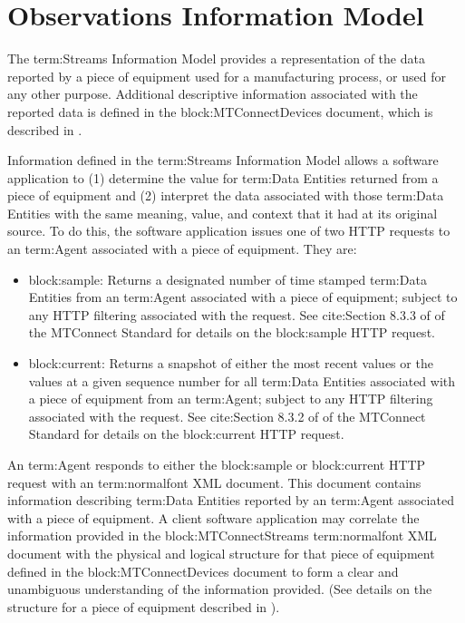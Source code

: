 
\section{Observations Information Model}
\label{sec:Observations Information Model}
The {term:Streams Information Model} provides a representation of the data reported by a piece of equipment used for a manufacturing process, or used for any other purpose.  Additional descriptive information associated with the reported data is defined in the {block:MTConnectDevices} document, which is described in .

Information defined in the {term:Streams Information Model} allows a software application to (1) determine the value for {term:Data Entities} returned from a piece of equipment and (2) interpret the data associated with those {term:Data Entities} with the same meaning, value, and context that it had at its original source.  To do this, the software application issues one of two HTTP requests to an {term:Agent} associated with a piece of equipment.  They are:


\begin{itemize}
\item {block:sample}:  Returns a designated number of time stamped {term:Data Entities} from an {term:Agent} associated with a piece of equipment; subject to any HTTP filtering associated with the request.  See {cite:Section 8.3.3} of  of the MTConnect Standard for details on the {block:sample} HTTP request.

\item {block:current}:  Returns a snapshot of either the most recent values or the values at a given sequence number for all {term:Data Entities} associated with a piece of equipment from an {term:Agent}; subject to any HTTP filtering associated with the request.  See {cite:Section 8.3.2} of  of the MTConnect Standard for details on the {block:current} HTTP request.
\end{itemize}

An {term:Agent} responds to either the {block:sample} or {block:current} HTTP request with an  {term:normalfont XML} document.  This document contains information describing {term:Data Entities} reported by an {term:Agent} associated with a piece of equipment.   A client software application may correlate the information provided in the {block:MTConnectStreams} {term:normalfont XML} document with the physical and logical structure for that piece of equipment defined in the {block:MTConnectDevices} document to form a clear and unambiguous understanding of the information provided.  (See details on the structure for a piece of equipment described in ).


